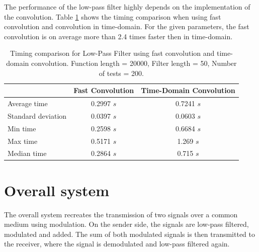 \documentclass{article}
\begin{document}
The performance of the low-pass filter highly depends on the implementation of the convolution.
Table \ref{tab:timing_comparison} shows the timing comparison when using fast convolution and convolution in time-domain.
For the given parameters, the fast convolution is on average more than 2.4 times faster then in time-domain.

\begin{table}[h!]
    \centering
    \begin{tabular}{|l|c|c|}
        \hline
                           & \textbf{Fast Convolution} & \textbf{Time-Domain Convolution} \\ \hline
        Average time       & 0.2997 \(s\)              & 0.7241 \(s\)                     \\ \hline
        Standard deviation & 0.0397 \(s\)              & 0.0603 \(s\)                     \\ \hline
        Min time           & 0.2598 \(s\)              & 0.6684 \(s\)                     \\ \hline
        Max time           & 0.5171 \(s\)              & 1.269 \(s\)                      \\ \hline
        Median time        & 0.2864 \(s\)              & 0.715 \(s\)                      \\ \hline
    \end{tabular}
    \caption{Timing comparison for Low-Pass Filter using fast convolution and time-domain convolution. Function length = 20000, Filter length = 50, Number of tests = 200.}
    \label{tab:timing_comparison}
\end{table}

\section{Overall system}

The overall system recreates the transmission of two signals over a common medium using modulation.
On the sender side, the signals are low-pass filtered, modulated and added.
The sum of both modulated signals is then transmitted to the receiver,
where the signal is demodulated and low-pass filtered again.
\end{document}
